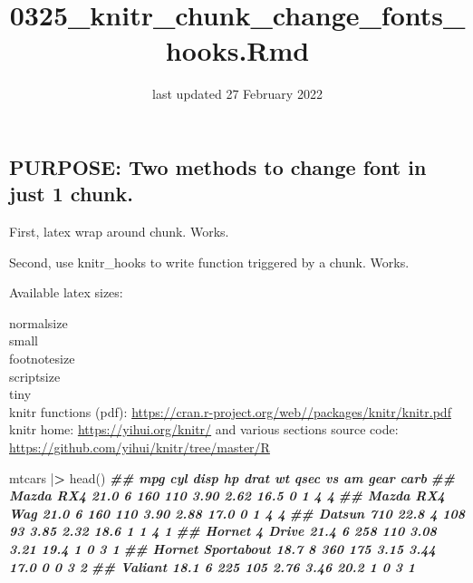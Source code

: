\documentclass[
  11pt,
]{article}
\title{0325\_knitr\_chunk\_change\_fonts\_hooks.Rmd}
\author{}
\date{\vspace{-2.5em}last updated 27 February 2022}
\newenvironment{Shaded}{\begin{snugshade}}{\end{snugshade}}
\newcommand{\DocumentationTok}[1]{\textcolor[rgb]{0.56,0.35,0.01}{\textbf{\textit{#1}}}}
\newcommand{\ErrorTok}[1]{\textcolor[rgb]{0.64,0.00,0.00}{\textbf{#1}}}
\newcommand{\FunctionTok}[1]{\textcolor[rgb]{0.00,0.00,0.00}{#1}}
\newcommand{\NormalTok}[1]{#1}
\newcommand{\SpecialCharTok}[1]{\textcolor[rgb]{0.00,0.00,0.00}{#1}}
\begin{document}
\maketitle

{
\setcounter{tocdepth}{2}
\tableofcontents
}
\hypertarget{purpose-two-methods-to-change-font-in-just-1-chunk.}{%
\subsection{PURPOSE: Two methods to change font in just 1
chunk.}\label{purpose-two-methods-to-change-font-in-just-1-chunk.}}

First, latex wrap around chunk. Works.

Second, use knitr\_hooks to write function triggered by a chunk. Works.

Available latex sizes:

\footnotesize

normalsize\\
small\\
footnotesize\\
scriptsize\\
tiny\\

knitr functions (pdf):
\url{https://cran.r-project.org/web//packages/knitr/knitr.pdf} knitr
home: \url{https://yihui.org/knitr/} and various sections source code:
\url{https://github.com/yihui/knitr/tree/master/R}

\normalsize

\begin{Shaded}
\begin{Highlighting}[]
\NormalTok{mtcars }\SpecialCharTok{|}\ErrorTok{\textgreater{}} \FunctionTok{head}\NormalTok{()}
      \DocumentationTok{\#\#                    mpg cyl disp  hp drat   wt qsec vs am gear carb}
      \DocumentationTok{\#\# Mazda RX4         21.0   6  160 110 3.90 2.62 16.5  0  1    4    4}
      \DocumentationTok{\#\# Mazda RX4 Wag     21.0   6  160 110 3.90 2.88 17.0  0  1    4    4}
      \DocumentationTok{\#\# Datsun 710        22.8   4  108  93 3.85 2.32 18.6  1  1    4    1}
      \DocumentationTok{\#\# Hornet 4 Drive    21.4   6  258 110 3.08 3.21 19.4  1  0    3    1}
      \DocumentationTok{\#\# Hornet Sportabout 18.7   8  360 175 3.15 3.44 17.0  0  0    3    2}
      \DocumentationTok{\#\# Valiant           18.1   6  225 105 2.76 3.46 20.2  1  0    3    1}
\end{Highlighting}
\end{Shaded}
\end{document}
